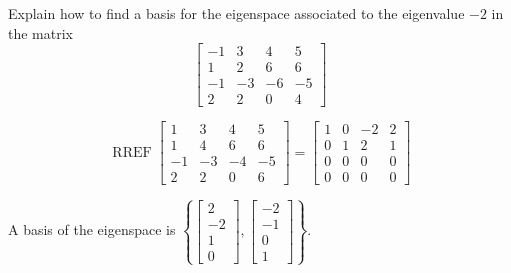 
\begin{exerciseStatement}


Explain how to find a basis for the eigenspace associated to the eigenvalue \( -2 \) in the matrix \[ \left[\begin{array}{cccc}
-1 & 3 & 4 & 5 \\
1 & 2 & 6 & 6 \\
-1 & -3 & -6 & -5 \\
2 & 2 & 0 & 4
\end{array}\right] \]


\end{exerciseStatement}
    
\begin{exerciseAnswer} 


\[\operatorname{RREF} \left[\begin{array}{cccc}
1 & 3 & 4 & 5 \\
1 & 4 & 6 & 6 \\
-1 & -3 & -4 & -5 \\
2 & 2 & 0 & 6
\end{array}\right] = \left[\begin{array}{cccc}
1 & 0 & -2 & 2 \\
0 & 1 & 2 & 1 \\
0 & 0 & 0 & 0 \\
0 & 0 & 0 & 0
\end{array}\right] \]



A basis of the eigenspace is \( \left\{ \left[\begin{array}{c}
2 \\
-2 \\
1 \\
0
\end{array}\right] , \left[\begin{array}{c}
-2 \\
-1 \\
0 \\
1
\end{array}\right] \right\} \).


\end{exerciseAnswer}
    
